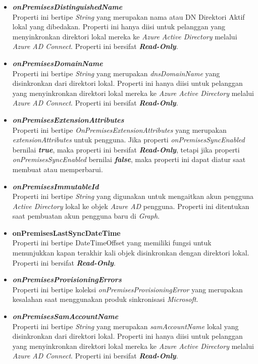 \begin{itemize}
	\item \textbf{\textit{onPremisesDistinguishedName}}\\
	Properti ini bertipe \textit{String} yang merupakan nama atau DN Direktori Aktif lokal yang dibedakan. Properti ini hanya diisi untuk pelanggan yang menyinkronkan direktori lokal mereka ke \textit{Azure Active Directory} melalui \textit{Azure AD Connect}. Properti ini bersifat \textbf{\textit{Read-Only}}.
	\item \textbf{\textit{onPremisesDomainName}}\\
	Properti ini bertipe \textit{String} yang merupakan \textit{dnsDomainName} yang disinkronkan dari direktori lokal. Properti ini hanya diisi untuk pelanggan yang menyinkronkan direktori lokal mereka ke \textit{Azure Active Directory} melalui \textit{Azure AD Connect}. Properti ini bersifat \textbf{\textit{Read-Only}}.
	\item \textbf{\textit{onPremisesExtensionAttributes}}\\
	Properti ini bertipe \textit{OnPremisesExtensionAttributes} yang merupakan \textit{extensionAttributes} untuk pengguna. Jika properti \textit{onPremisesSyncEnabled} bernilai \textbf{\textit{true}}, maka properti ini bersifat \textbf{\textit{Read-Only}}, tetapi jika properti \textit{onPremisesSyncEnabled} bernilai \textbf{\textit{false}}, maka properti ini dapat diatur saat membuat atau memperbarui.
	\item \textbf{\textit{onPremisesImmutableId}}\\
	Properti ini bertipe \textit{String} yang digunakan untuk mengaitkan akun pengguna \textit{Active Directory} lokal ke objek \textit{Azure AD} pengguna. Properti ini ditentukan saat pembuatan akun pengguna baru di \textit{Graph}.
	\item \textbf{onPremisesLastSyncDateTime}\\
	Properti ini bertipe DateTimeOffset yang memiliki fungsi untuk menunjukkan kapan terakhir kali objek disinkronkan dengan direktori lokal. Properti ini bersifat \textbf{\textit{Read-Only}}. 
	\item \textbf{\textit{onPremisesProvisioningErrors}}\\
	Properti ini bertipe koleksi \textit{onPremisesProvisioningError} yang merupakan kesalahan saat menggunakan produk sinkronisasi \textit{Microsoft}.
	 \item \textbf{\textit{onPremisesSamAccountName}}\\
	Properti ini bertipe \textit{String} yang merupakan \textit{samAccountName} lokal yang disinkronkan dari direktori lokal. Properti ini hanya diisi untuk pelanggan yang menyinkronkan direktori lokal mereka ke \textit{Azure Active Directory} melalui \textit{Azure AD Connect}. Properti ini bersifat \textbf{\textit{Read-Only}}.

\end{itemize}
